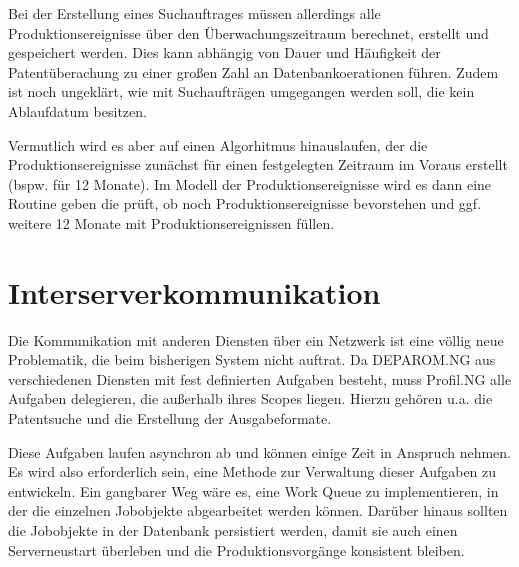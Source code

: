 Bei der Erstellung eines Suchauftrages müssen allerdings alle
Produktionsereignisse über den Überwachungszeitraum berechnet, erstellt und
gespeichert werden. Dies kann abhängig von Dauer und Häufigkeit der
Patentüberachung zu einer großen Zahl an Datenbankoerationen führen. Zudem ist
noch ungeklärt, wie mit Suchaufträgen umgegangen werden soll, die kein
Ablaufdatum besitzen.

Vermutlich wird es aber auf einen Algorhitmus hinauslaufen, der die
Produktionsereignisse zunächst für einen festgelegten Zeitraum im Voraus
erstellt (bspw. für 12 Monate). Im Modell der Produktionsereignisse wird es dann
eine Routine geben die prüft, ob noch Produktionsereignisse bevorstehen und ggf.
weitere 12 Monate mit Produktionsereignissen füllen.

\section{Interserverkommunikation}
\label{ch:Lösungsansatze:Interserverkommunikation}

Die Kommunikation mit anderen Diensten über ein Netzwerk ist eine völlig neue
Problematik, die beim bisherigen System nicht auftrat. Da DEPAROM.NG aus
verschiedenen Diensten mit fest definierten Aufgaben besteht, muss Profil.NG
alle Aufgaben delegieren, die außerhalb ihres Scopes liegen. Hierzu gehören u.a.
die Patentsuche und die Erstellung der Ausgabeformate.

Diese Aufgaben laufen asynchron ab und können einige Zeit in Anspruch nehmen. Es
wird also erforderlich sein, eine Methode zur Verwaltung dieser Aufgaben zu
entwickeln. Ein gangbarer Weg wäre es, eine Work Queue zu implementieren, in
der die einzelnen Jobobjekte abgearbeitet werden können. Darüber hinaus sollten
die Jobobjekte in der Datenbank persistiert werden, damit sie auch einen
Serverneustart überleben und die Produktionsvorgänge konsistent bleiben.
